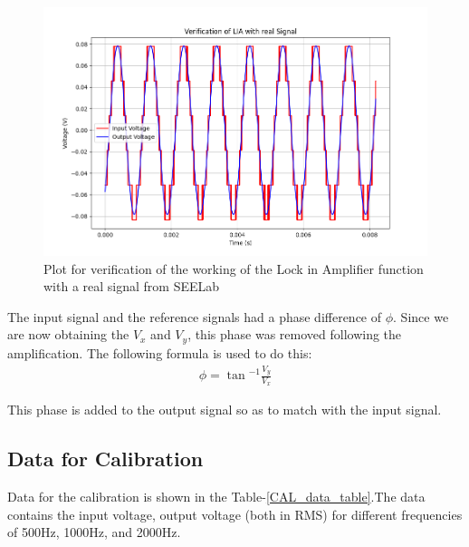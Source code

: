 \documentclass{article}
\begin{document}
\begin{multicols}{2}
\begin{figure}[H]
    \centering
    \includegraphics[width=\columnwidth]{Images/LIA_verify_real.png}
    \caption{Plot for verification of the working of the Lock in Amplifier function with a real signal from SEELab}
    \label{LIA_verify_real}
\end{figure}


The input signal and the reference signals had a phase difference of $\phi$. Since we are now obtaining the $V_x$ and $V_y$, this phase was removed following the amplification. The following formula is used to do this:
\begin{eqnarray}
    \phi  = \tan{^{-1}}{\frac{V_y}{V_x}}
\end{eqnarray}

This phase is added to the output signal so as to match with the input signal.





\subsection{Data for Calibration}

Data for the calibration is shown in the Table-\ref{CAL_data_table}.The data contains the input voltage, output voltage (both in RMS) for different frequencies of 500Hz, 1000Hz, and 2000Hz.



\end{multicols}
\end{document}
